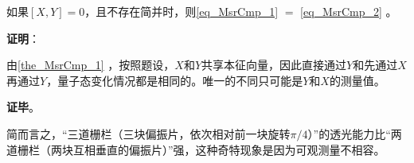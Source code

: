 \begin{theorem}{}
如果$[X, Y]=0$，且不存在简并时，则\autoref{eq_MsrCmp_1} $=$ \autoref{eq_MsrCmp_2} 。
\end{theorem}

\textbf{证明}：

由\autoref{the_MsrCmp_1} ，按照题设，$X$和$Y$共享本征向量，因此直接通过$Y$和先通过$X$再通过$Y$，量子态变化情况都是相同的。唯一的不同只可能是$Y$和$X$的测量值。

\textbf{证毕}。

简而言之，“三道栅栏（三块偏振片，依次相对前一块旋转$\pi/4$）”的透光能力比“两道栅栏（两块互相垂直的偏振片）”强，这种奇特现象是因为可观测量不相容。

























